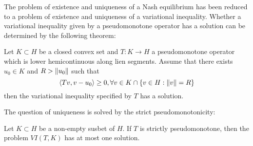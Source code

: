 
The problem of existence and uniqueness of a Nash equilibrium has been reduced to a problem of existence and uniqueness of a variational inequality. Whether a variational inequality given by a pseudomonotone operator has a solution can be determined by the following theorem:
\begin{theorem}
  \label{thm:existence}
  Let $K\subset H$ be a closed convex set and $T:K\to H$ a pseudomonotone operator which is lower hemicontinuous along lien segments. Assume that there exists $u_0 \in K$ and $R> \left \Vert u_0 \right \Vert$ such that
  \begin{equation}
    \left \langle Tv,v-u_0 \right \rangle \geq 0, \forall v \in K \cap \{v \in H : \left \Vert v \right \Vert = R \}
  \end{equation}
  then the variational inequality specified by $T$ has a solution.
\end{theorem}
The question of uniqueness is solved by the strict pseudomonotonicity:
\begin{theorem}
  Let $K\subset H$ be a non-empty susbet of $H$. If $T$ is strictly pseudomonotone, then the problem $VI(T,K)$ has at most one solution.
\end{theorem}

